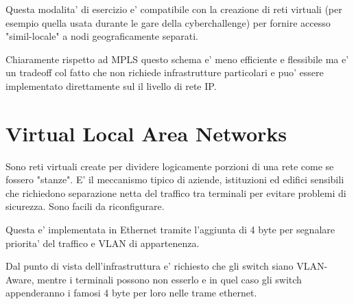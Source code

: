 Questa modalita' di esercizio e' compatibile con la creazione di reti virtuali (per esempio quella usata durante le gare della cyberchallenge) per fornire accesso "simil-locale" a nodi geograficamente separati.

Chiaramente rispetto ad MPLS questo schema e' meno efficiente e flessibile ma e' un tradeoff col fatto che non richiede infrastrutture particolari e puo' essere implementato direttamente sul il livello di rete IP.


\section{Virtual Local Area Networks}

Sono reti virtuali create per dividere logicamente porzioni di una rete come se fossero "stanze". E' il meccanismo tipico di aziende, istituzioni ed edifici sensibili che richiedono separazione netta del traffico tra terminali per evitare problemi di sicurezza. Sono facili da riconfigurare.


Questa e' implementata in Ethernet tramite l'aggiunta di 4 byte per segnalare priorita' del traffico e VLAN di appartenenza.


Dal punto di vista dell'infrastruttura e' richiesto che gli switch siano VLAN-Aware, mentre i terminali possono non esserlo e in quel caso gli switch appenderanno i famosi 4 byte per loro nelle trame ethernet.
